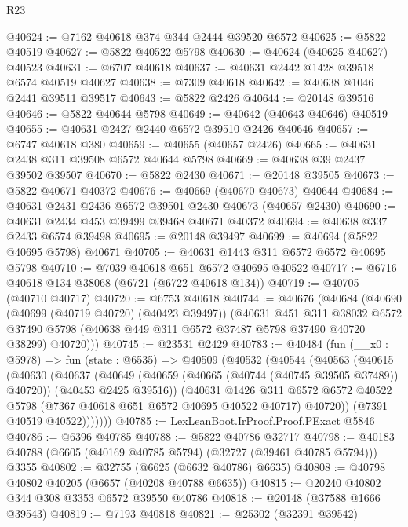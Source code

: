 \begin{lexlean}{R23}
\begin{coremodule}
@40624 := @7162 @40618 @374 @344 @2444 @39520 @6572
@40625 := @5822 @40519
@40627 := @5822 @40522 @5798
@40630 := @40624 (@40625 @40627) @40523
@40631 := @6707 @40618
@40637 := @40631 @2442 @1428 @39518 @6574 @40519 @40627
@40638 := @7309 @40618
@40642 := @40638 @1046 @2441 @39511 @39517
@40643 := @5822 @2426
@40644 := @20148 @39516
@40646 := @5822 @40644 @5798
@40649 := @40642 (@40643 @40646) @40519
@40655 := @40631 @2427 @2440 @6572 @39510 @2426 @40646
@40657 := @6747 @40618 @380
@40659 := @40655 (@40657 @2426)
@40665 := @40631 @2438 @311 @39508 @6572 @40644 @5798
@40669 := @40638 @39 @2437 @39502 @39507
@40670 := @5822 @2430
@40671 := @20148 @39505
@40673 := @5822 @40671 @40372
@40676 := @40669 (@40670 @40673) @40644
@40684 := @40631 @2431 @2436 @6572 @39501 @2430 @40673 (@40657 @2430)
@40690 := @40631 @2434 @453 @39499 @39468 @40671 @40372
@40694 := @40638 @337 @2433 @6574 @39498
@40695 := @20148 @39497
@40699 := @40694 (@5822 @40695 @5798) @40671
@40705 := @40631 @1443 @311 @6572 @6572 @40695 @5798
@40710 := @7039 @40618 @651 @6572 @40695 @40522
@40717 := @6716 @40618 @134 @38068 (@6721 (@6722 @40618 @134))
@40719 := @40705 (@40710 @40717)
@40720 := @6753 @40618
@40744 := @40676
    (@40684
      (@40690
        (@40699 (@40719 @40720) (@40423 @39497))
        (@40631
          @451
          @311
          @38032
          @6572
          @37490
          @5798
          (@40638 @449 @311 @6572 @37487 @5798 @37490 @40720 @38299)
          @40720)))
@40745 := @23531 @2429
@40783 := @40484
    (fun (__x0 : @5978) =>
    fun (state : @6535) =>
    @40509
      (@40532
        (@40544
          (@40563
            (@40615
              (@40630
                (@40637
                  (@40649
                    (@40659 (@40665 (@40744 (@40745 @39505 @37489)) @40720))
                    (@40453 @2425 @39516))
                  (@40631
                    @1426
                    @311
                    @6572
                    @6572
                    @40522
                    @5798
                    (@7367 @40618 @651 @6572 @40695 @40522 @40717)
                    @40720))
                (@7391 @40519 @40522)))))))
@40785 := LexLeanBoot.IrProof.Proof.PExact @5846
@40786 := @6396 @40785
@40788 := @5822 @40786 @32717
@40798 := @40183 @40788 (@6605 (@40169 @40785 @5794) (@32727 (@39461 @40785 @5794))) @3355
@40802 := @32755 (@6625 (@6632 @40786) @6635)
@40808 := @40798 @40802 @40205 (@6657 (@40208 @40788 @6635))
@40815 := @20240 @40802 @344 @308 @3353 @6572 @39550 @40786
@40818 := @20148 (@37588 @1666 @39543)
@40819 := @7193 @40818
@40821 := @25302 (@32391 @39542)

\end{coremodule}
\end{lexlean}
